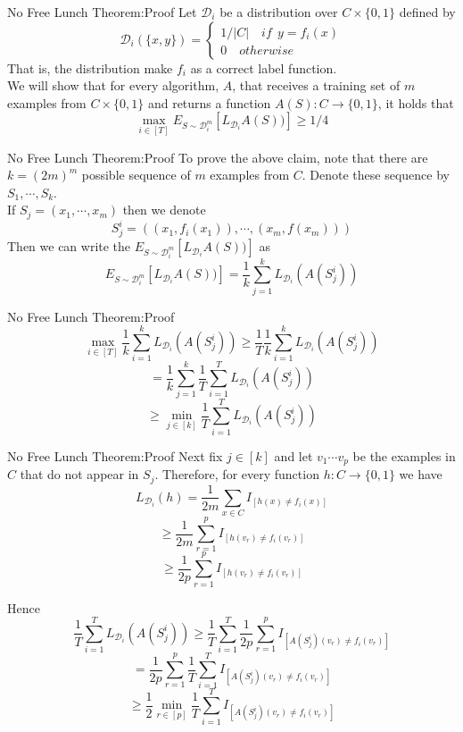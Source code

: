 \documentclass{beamer}
\begin{document}
\begin{frame}{No Free Lunch Theorem:Proof}
	Let $\mathcal{D}_i$ be a distribution over $C \times \{0,1\}$ defined by
	\[\mathcal{D}_i(\{x,y\}) = \begin{cases}
			1/|C| \quad if \ \ y=f_i(x) \\
			0 \quad otherwise
	\end{cases}\]
	That is, the distribution make $f_i$ as a correct label function. \\
	We will show that for every algorithm, $A$, that receives a training set of $m$ examples from $C \times \{0,1\}$ and returns a function $A(S): C \rightarrow \{0,1\}$, it holds that 
\[\max_{i \in [T]} E_{S \sim \mathcal{D}^m_i} [L_{\mathcal{D}_i} A(S))] \geq 1/4\]
\end{frame}
\begin{frame}{No Free Lunch Theorem:Proof}
	To prove the above claim, note that there are $k = (2m)^m$ possible sequence of $m$ examples from $C$. Denote these sequence by $S_1, \cdots, S_k$. \\
	If $S_j = (x_1, \cdots, x_m)$ then we denote 
	\[S_j^i = ((x_1,f_i(x_1)), \cdots, (x_m,f(x_m)) )\]
Then we can write the $E_{S \sim \mathcal{D}^m_i} [L_{\mathcal{D}_i} A(S))]$ as 
\[E_{S \sim \mathcal{D}^m_i} [L_{\mathcal{D}_i} A(S))] = \frac{1}{k} \sum^k_{j=1} L_{\mathcal{D}_i} (A(S^i_j))\]
\end{frame}
\begin{frame}{No Free Lunch Theorem:Proof}
	\[\max_{i \in [T]} \frac{1}{k} \sum^k_{i=1} L_{\mathcal{D}_i} (A(S^i_j)) \geq \frac{1}{T} \frac{1}{k} \sum^k_{i=1} L_{\mathcal{D}_i} (A(S^i_j))\]
	\[= \frac{1}{k} \sum^k_{j=1} \frac{1}{T} \sum^T_{i=1} L_{\mathcal{D}_i} (A(S^i_j))\]
	\[\geq \min_{j \in [k]} \frac{1}{T} \sum^T_{i=1} L_{\mathcal{D}_i}(A(S_j^i))\]
\end{frame}
\begin{frame}{No Free Lunch Theorem:Proof}
	Next fix $j \in [k]$ and let $v_1 \cdots v_p$ be the examples in $C$ that do not appear in $S_j$. Therefore, for every function $h:C \rightarrow \{0,1\}$ we have 
	\[L_{\mathcal{D}_i}(h) = \frac{1}{2m} \sum_{x \in C} I_{[h(x) \neq f_i(x)]}\]
\[\geq \frac{1}{2m} \sum^p_{r=1} I_{[h(v_r) \neq f_i(v_r)]}\]
\[\geq \frac{1}{2p} \sum^p_{r=1} I_{[h(v_r) \neq f_i(v_r)]}\]
\end{frame}
\begin{frame}
Hence 
\[\frac{1}{T} \sum^T_{i=1} L_{\mathcal{D}_i}(A(S_j^i)) \geq \frac{1}{T} \sum^T_{i=1}  \frac{1}{2p} \sum^p_{r=1} I_{[A(S^i_j)(v_r) \neq f_i(v_r)]}\]
\[= \frac{1}{2p} \sum^p_{r=1} \frac{1}{T} \sum^T_{i=1} I_{[A(S^i_j)(v_r) \neq f_i(v_r)]}\]
\[\geq \frac{1}{2} \min_{r \in [p]} \frac{1}{T} \sum^T_{i=1} I_{[A(S^i_j)(v_r) \neq f_i(v_r)]}\]
\end{frame}
\end{document}

